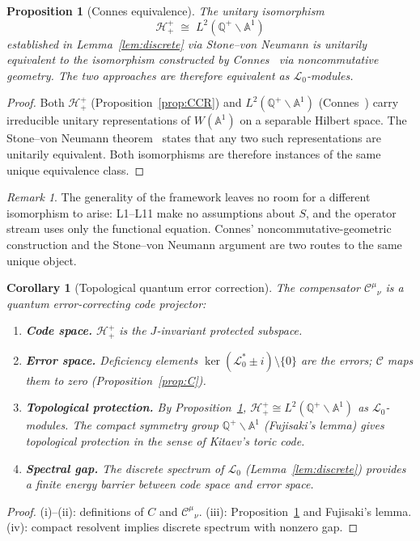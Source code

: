 \documentclass[12pt,a4paper]{article}
\newtheorem{proposition}[theorem]{Proposition}
\newtheorem{corollary}[theorem]{Corollary}
\theoremstyle{remark}
\newtheorem*{remark}{Remark}
\begin{document}
\begin{proposition}[Connes equivalence]\label{prop:ConnesEquiv}
The unitary isomorphism
\[
  \mathcal{H}^+_+ \;\cong\; L^2(\mathbb{Q}^+\backslash\mathbb{A}^1)
\]
established in Lemma~\ref{lem:discrete} via Stone--von Neumann
is unitarily equivalent to the isomorphism constructed by
Connes~\cite{Connes1999} via noncommutative geometry.
The two approaches are therefore equivalent as $\mathcal{L}_0$-modules.
\end{proposition}
\begin{proof}
Both $\mathcal{H}^+_+$ (Proposition~\ref{prop:CCR}) and
$L^2(\mathbb{Q}^+\backslash\mathbb{A}^1)$ (Connes~\cite{Connes1999})
carry irreducible unitary representations of $W(\mathbb{A}^1)$
on a separable Hilbert space.
The Stone--von Neumann theorem~\cite{Weil1964} states that any two
such representations are unitarily equivalent.
Both isomorphisms are therefore instances of the same unique
equivalence class.
\end{proof}

\begin{remark}
The generality of the framework leaves no room for a different
isomorphism to arise: L1--L11 make no assumptions about $S$, and the
operator stream uses only the functional equation.
Connes' noncommutative-geometric construction and the Stone--von Neumann
argument are two routes to the same unique object.
\end{remark}

\begin{corollary}[Topological quantum error correction]\label{cor:QEC}
The compensator $\mathcal{C}^{\mu}{}_\nu$ is a quantum error-correcting
code projector:
\begin{enumerate}[label=(\roman*),leftmargin=*]
\item \textbf{Code space.} $\mathcal{H}^+_+$ is the $J$-invariant
  protected subspace.
\item \textbf{Error space.} Deficiency elements
  $\ker(\mathcal{L}_0^*\pm i)\setminus\{0\}$ are the errors;
  $\mathcal{C}$ maps them to zero (Proposition~\ref{prop:C}).
\item \textbf{Topological protection.} By Proposition~\ref{prop:ConnesEquiv},
  $\mathcal{H}^+_+\cong L^2(\mathbb{Q}^+\backslash\mathbb{A}^1)$
  as $\mathcal{L}_0$-modules.
  The compact symmetry group $\mathbb{Q}^+\backslash\mathbb{A}^1$
  (Fujisaki's lemma) gives topological protection in the sense of
  Kitaev's toric code.
\item \textbf{Spectral gap.} The discrete spectrum of $\mathcal{L}_0$
  (Lemma~\ref{lem:discrete}) provides a finite energy barrier between
  code space and error space.
\end{enumerate}
\end{corollary}
\begin{proof}
(i)--(ii): definitions of $C$ and $\mathcal{C}^{\mu}{}_\nu$.
(iii): Proposition~\ref{prop:ConnesEquiv} and Fujisaki's lemma.
(iv): compact resolvent implies discrete spectrum with nonzero gap.
\end{proof}
\end{document}
